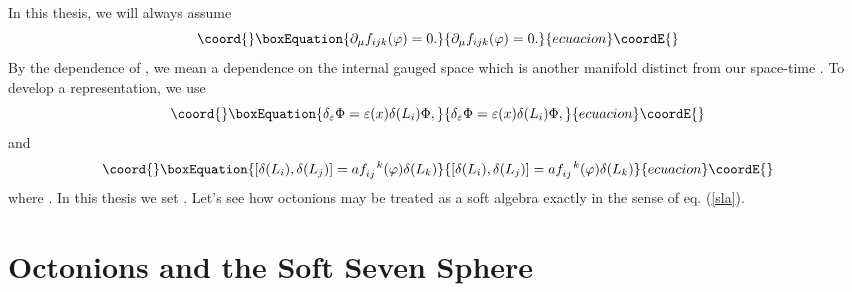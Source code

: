 \documentclass[a4paper,12pt]{book}
\begin{document}
In this thesis, we will always assume 
\begin{equation}\coord{}\boxEquation{
\partial _{\mu }f_{ijk}(\varphi )=0.
}{
\partial _{\mu }f_{ijk}(\varphi )=0.
}{ecuacion}\coordE{}\end{equation}
By the \myHighlight{$\varphi $}\coordHE{} dependence of \coordHE{}, we mean a dependence on
the internal gauged space which is another manifold distinct from our
space-time \coordHE{}. To develop a representation, we use 
\begin{equation}\coord{}\boxEquation{
\delta _{\varepsilon }\Phi =\varepsilon (x)\delta (L_{i})\Phi ,
}{
\delta _{\varepsilon }\Phi =\varepsilon (x)\delta (L_{i})\Phi ,
}{ecuacion}\coordE{}\end{equation}
and 
\begin{equation}\coord{}\boxEquation{
\lbrack \delta (L_{i}),\delta (L_{j})]=af_{ij}^{\ \ k}(\varphi )\delta
(L_{k})  \label{sla}
}{
\lbrack \delta (L_{i}),\delta (L_{j})]=af_{ij}^{\ \ k}(\varphi )\delta
(L_{k})  }{ecuacion}\coordE{}\end{equation}
where \coordHE{}. In this thesis we set \coordHE{}. Let's see how octonions
may be treated as a soft algebra exactly in the sense of eq. (\ref{sla}).

\section{Octonions and the Soft Seven Sphere}
\end{document}
